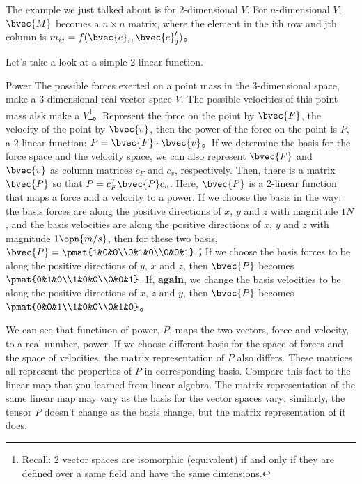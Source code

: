 The example we just talked about is for 2-dimensional $V$. For $n$-dimensional $V$, $\bvec{M}$ becomes a $n\times n$ matrix, where the element in the ith row and jth column is $m_{ij}=f(\bvec{e}_i, \bvec{e}'_j)$。

Let's take a look at a simple 2-linear function. 

\begin{example}{Power}
The possible forces exerted on a point mass in the 3-dimensional space, make a 3-dimensional real vector space $V$. The possible velocities of this point mass alsk make a $V$\footnote{Recall: 2 vector spaces are isomorphic (equivalent) if and only if they are defined over a same field and have the same dimensions. }。Represent the force on the point by $\bvec{F}$, the velocity of the point by $\bvec{v}$, then the power of the force on the point is $P$, a 2-linear function: $P=\bvec{F}\cdot\bvec{v}$。If we determine the basis for the force space and the velocity space, we can also represent $\bvec{F}$ and $\bvec{v}$ as column matrices $c_F$ and $c_v$, respectively. Then, there is a matrix $\bvec{P}$ so that $P=c^T_F\bvec{P}c_v$. Here, $\bvec{P}$ is a 2-linear function that maps a force and a velocity to a power. If we choose the basis in the way: the basis forces are along the positive directions of $x$, $y$ and $z$ with magnitude $1N$, and the basis velocities are along the positive directions of $x$, $y$ and $z$ with magnitude $1\opn{m/s}$, then for these two basis, $\bvec{P}=\pmat{1&0&0\\0&1&0\\0&0&1}$；If we choose the basis forces to be along the positive directions of $y$, $x$ and $z$, then $\bvec{P}$ becomes $\pmat{0&1&0\\1&0&0\\0&0&1}$. If, \textbf{again}, we change the basis velocities to be along the positive directions of $x$, $z$ and $y$, then $\bvec{P}$ becomes $\pmat{0&0&1\\1&0&0\\0&1&0}$。
\end{example}



We can see that functiuon of power, $P$, maps the two vectors, force and velocity, to a real number, power. If we choose different basis for the space of forces and the space of velocities, the matrix representation of $P$ also differs. These matrices all represent the properties of $P$ in corresponding basis. Compare this fact to the linear map that you learned from linear algebra. The matrix representation of the same linear map may vary as the basis for the vector spaces vary; similarly, the tensor $P$ doesn't change as the basis change, but the matrix representation of it does. 

